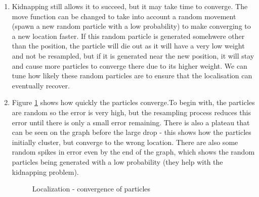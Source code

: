 \documentclass[12pt,a4paper]{article}
\begin{document}
\begin{enumerate}[label=(\alph*)]
	\item Kidnapping still allows it to succeed, but it may take time to converge. The move function can be changed to take into account a random movement (spawn a new random particle with a low probability) to make converging to a new location faster. If this random particle is generated somehwere other than the position, the particle will die out as it will have a very low weight and not be resampled, but if it is generated near the new position, it will stay and cause more particles to converge there due to its higher weight. We can tune how likely these random particles are to ensure that the localisation can eventually recover. 

	\item Figure \ref{fig:localization} shows how quickly the particles converge.To begin with, the particles are random so the error is very high, but the resampling process reduces this error until there is only a small error remaining. There is also a plateau that can be seen on the graph before the large drop - this shows how the particles initially cluster, but converge to the wrong location. There are also some random spikes in error even by the end of the graph, which shows the random particles being generated with a low probability (they help with the kidnapping problem).
	\begin{figure}[h!]
		\centering
		\qquad
		\caption{Localization - convergence of particles}%
		\label{fig:localization}%
	\end{figure}


\end{enumerate}
\end{document}
